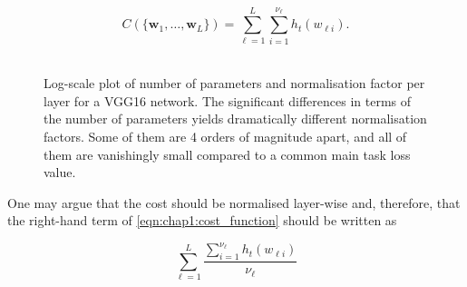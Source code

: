 \begin{equation}
  \label{eqn:chap1:cost_function}
  C(\{\mathbf{w}_1,\dots, \mathbf{w}_L\}) = \displaystyle \sum_{\ell=1}^{L} \sum_{i=1}^{\nu_\ell} h_t(w_{\ell i}).
\end{equation} \\


\begin{figure}
  \centering
    \caption{ Log-scale plot of
    number of parameters and normalisation factor per layer for a VGG16
    network. The significant differences in terms of the number of parameters
    yields dramatically different normalisation factors. Some of them are 4
    orders of magnitude apart, and all of them are vanishingly small compared
    to a common main task loss value.}
  \label{fig:chap1:vgg16_per_layer_param_and_norm_factor}
\end{figure}

One may argue that the cost should be normalised layer-wise and, therefore,
that the right-hand term of \cref{eqn:chap1:cost_function} should be written as

$$\displaystyle\sum_{\ell=1}^{L}\frac{\displaystyle \sum_{i=1}^{\nu_\ell}
    h_t(w_{\ell i})}{\nu_\ell}$$

